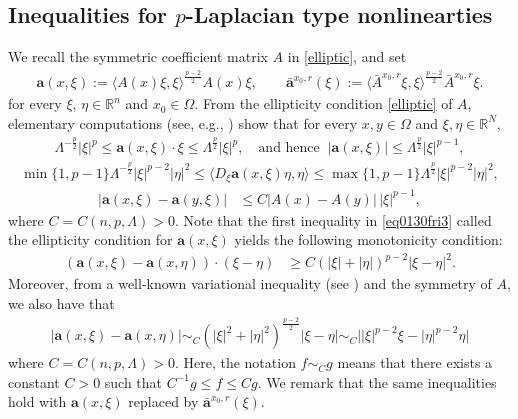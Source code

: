 \documentclass[reqno]{amsart}
\numberwithin{equation}{section}
\theoremstyle{plain}
\theoremstyle{definition}
\theoremstyle{remark}
\providecommand{\abs}[1]{\lvert#1\rvert}
\providecommand{\ip}[1]{\langle#1\rangle}
\newcommand{\bR}{\mathbb{R}}
\begin{document}
\subsection{Inequalities for \texorpdfstring{$p$}{p}-Laplacian type nonlinearties}
We recall the symmetric coefficient matrix $A$ in \eqref{elliptic}, and set
\begin{align*}
\mathbf{a}(x,\xi) := \ip{A(x)\xi,\xi}^{\frac{p-2}{2}} A(x)\xi, \qquad
\bar{\mathbf{a}}^{x_0,r}(\xi) := \ip{\bar{A}^{x_0,r}\xi,\xi}^{\frac{p-2}{2}} \bar{A}^{x_0,r} \xi .
\end{align*}
for every $\xi$, $\eta\in \bR^n$ and $x_0\in\Omega$.
From the ellipticity condition \eqref{elliptic} of $A$, elementary computations (see, e.g., \cite{KZ99,KM14}) show that for every $x,y\in\Omega$ and $\xi,\eta\in\bR^N$,
\begin{align} \label{eq0130fri1}
\Lambda^{-\frac{p}{2}}\abs{\xi}^p \leq \mathbf{a}(x,\xi)\cdot\xi \leq \Lambda^{\frac{p}{2}} \abs{\xi}^p, \quad \text{and hence }\ |\mathbf{a}(x,\xi)| \leq \Lambda^{\frac{p}{2}} \abs{\xi}^{p-1},
\end{align}
\begin{align} \label{eq0130fri3} 
\min\{1,p-1\} \Lambda^{-\frac{p}{2}}\abs{\xi}^{p-2}\abs{\eta}^2 \leq \ip{D_\xi\mathbf{a}(x,\xi)\eta,\eta} \leq \max\{1,p-1\}\Lambda^{\frac{p}{2}}\abs{\xi}^{p-2}\abs{\eta}^2,
\end{align}
\begin{align} \label{eq0202thr1}
\abs{\mathbf{a}(x,\xi) - \mathbf{a}(y,\xi)} &\leq C\abs{ A(x) -A(y) } \,\abs{\xi}^{p-1},
\end{align}
where $C=C(n,p,\Lambda)>0$. Note that the first inequality in \eqref{eq0130fri3} called the ellipticity condition for $\mathbf{a}(x,\xi)$ yields the following monotonicity condition:
\begin{align}\label{eq0127tue2}
( \mathbf{a}(x,\xi)-\mathbf{a}(x,\eta))\cdot(\xi-\eta)&\geq C(\abs{\xi}+\abs{\eta})^{p-2} \abs{\xi-\eta}^{2}.
\end{align}
Moreover, from a well-known variational inequality (see \cite[Lemma 3]{DE08}) and the symmetry of $A$, we also have that
\begin{align}\label{eq0127tue3}
\abs{ \mathbf{a}(x,\xi)-\mathbf{a}(x,\eta)} \sim_C (\abs{\xi}^2+\abs{\eta}^2)^{\frac{p-2}{2}}\abs{\xi-\eta}\sim_C \big| \abs{\xi}^{p-2}\xi-\abs{\eta}^{p-2}\eta \big|
\end{align}
where $C=C(n,p,\Lambda)>0$. Here, the notation $f \sim_C g $ means that there exists a constant $C>0$ such that $C^{-1} g \leq f \leq C g$. We remark that the same inequalities hold with $\mathbf{a}(x,\xi)$ replaced by $\bar{\mathbf{a}}^{x_0,r}(\xi)$.
  
\end{document}
